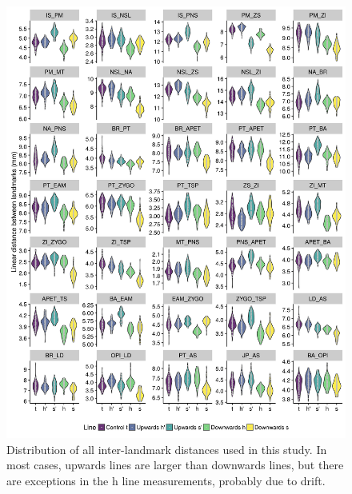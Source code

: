 \begin{refsection}
\begin{figure}
    \centering
    \includegraphics[width=\linewidth]{chapter_ratones/media/SI/figureS6.png}
    \caption{Distribution of all inter-landmark distances used in this
        study. In most cases, upwards lines are larger than downwards lines, but
        there are exceptions in the h line measurements, probably due to
        drift.}
    \label{figsup:traits}
\end{figure}


\end{refsection}
